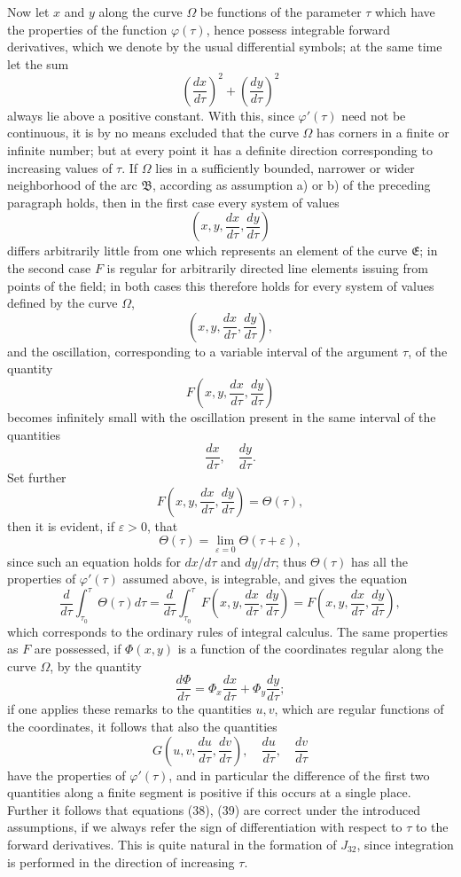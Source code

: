 \documentclass[11pt,a4paper,leqno]{article}
\begin{document}
Now let $x$ and $y$ along the curve $\Omega$ be functions of the parameter $\tau$ which have the properties of the function $\varphi(\tau)$, hence possess integrable forward derivatives, which we denote by the usual differential symbols; at the same time let the sum
\[
\left(\frac{dx}{d\tau}\right)^2+
\left(\frac{dy}{d\tau}\right)^2
\]
always lie above a positive constant. With this, since $\varphi'(\tau)$ need not be continuous, it is by no means excluded that the
curve $\Omega$ has corners in a finite or infinite number; but at every point it has a definite direction corresponding to increasing values of $\tau$. If $\Omega$ lies in a sufficiently bounded, narrower or wider neighborhood of the arc $\mathfrak{B}$, according as assumption a) or b) of the preceding paragraph holds, then in the first case every system of values
\[
\left(x,y,\frac{dx}{d\tau},\frac{dy}{d\tau}\right)
\]
differs arbitrarily little from one which represents an element of the curve $\mathfrak{E}$; in the second case $F$ is regular for arbitrarily directed line elements issuing from points of the field; in both cases this therefore holds for every system of values defined by the curve $\Omega$,
\[
\left(x,y,\frac{dx}{d\tau},\frac{dy}{d\tau}\right),
\]
and the oscillation, corresponding to a variable interval of the argument $\tau$, of the quantity
\[
F\left(x,y,\frac{dx}{d\tau},\frac{dy}{d\tau}\right)
\]
becomes infinitely small with the oscillation present in the same interval of the quantities
\[
\frac{dx}{d\tau},\quad \frac{dy}{d\tau}.
\]
Set further
\[
F\left(x,y,\frac{dx}{d\tau},\frac{dy}{d\tau}\right)=\Theta(\tau),
\]
then it is evident, if $\varepsilon>0$, that
\[
\Theta(\tau)=\lim_{\varepsilon=0}\Theta(\tau+\varepsilon),
\]
since such an equation holds for $dx/d\tau$ and $dy/d\tau$; thus $\Theta(\tau)$ has all the properties of $\varphi'(\tau)$ assumed above, is integrable, and gives the equation
\[
\frac{d}{d\tau}\int_{\tau_0}^{\tau}\Theta(\tau)d\tau
=\frac{d}{d\tau}\int_{\tau_0}^{\tau}F\left(x,y,\frac{dx}{d\tau},\frac{dy}{d\tau}\right)
=F\left(x,y,\frac{dx}{d\tau},\frac{dy}{d\tau}\right),
\]
which corresponds to the ordinary rules of integral calculus. The same properties as $F$ are possessed, if $\Phi(x,y)$ is a function of the coordinates regular along the curve $\Omega$, by the quantity
\[
\frac{d\Phi}{d\tau}=\Phi_x\frac{dx}{d\tau}+\Phi_y\frac{dy}{d\tau};
\]
if one applies these remarks to the quantities $u,v$, which are regular functions of the coordinates, it follows that also the quantities
\[
G\left(u,v,\frac{du}{d\tau},\frac{dv}{d\tau}\right),
\quad \frac{du}{d\tau},\quad \frac{dv}{d\tau}
\]
have the properties of $\varphi'(\tau)$, and in particular the difference of the first two quantities along a finite segment is positive if this occurs at a single place. Further it follows that equations (38), (39) are correct under the introduced assumptions, if we always refer the sign of differentiation with respect to $\tau$ to the forward derivatives. This is quite natural in the formation of $J_{32}$, since integration is performed in the direction of increasing $\tau$.
\end{document}
